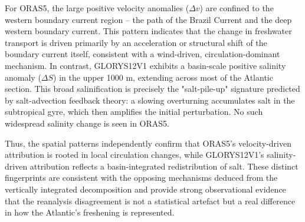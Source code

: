\documentclass[11pt,a4paper]{article}
\begin{document}
For ORAS5, the large positive velocity anomalies (\(\Delta v\)) are confined to the western boundary current region -- the path of the Brazil Current and the deep western boundary current. This pattern indicates that the change in freshwater transport is driven primarily by an acceleration or structural shift of the boundary current itself, consistent with a wind-driven, circulation-dominant mechanism. In contrast, GLORYS12V1 exhibits a basin-scale positive salinity anomaly (\(\Delta S\)) in the upper 1000 m, extending across most of the Atlantic section. This broad salinification is precisely the "salt-pile-up" signature predicted by salt-advection feedback theory: a slowing overturning accumulates salt in the subtropical gyre, which then amplifies the initial perturbation. No such widespread salinity change is seen in ORAS5.

Thus, the spatial patterns independently confirm that ORAS5's velocity-driven attribution is rooted in local circulation changes, while GLORYS12V1's salinity-driven attribution reflects a basin-integrated redistribution of salt. These distinct fingerprints are consistent with the opposing mechanisms deduced from the vertically integrated decomposition and provide strong observational evidence that the reanalysis disagreement is not a statistical artefact but a real difference in how the Atlantic's freshening is represented.
\end{document}
